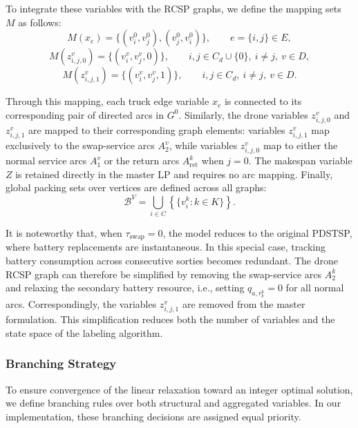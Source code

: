\documentclass[3p, authoryear, 11pt]{elsarticle}
\begin{document}
To integrate these variables with the RCSP graphs, we define the mapping sets $M$ as follows:
\[
M(x_e)=\{(v_i^0,v_j^0),(v_j^0,v_i^0)\},
\qquad e=\{i,j\}\in E,
\]
\[
M(z_{i,j,0}^v)=\{(v_i^v,v_j^v,0)\},
\qquad
i, j\in C_d\cup\{0\},\  i\neq j,\ v\in D,
\]
\[
M(z_{i,j,1}^v)=\{(v_i^v,v_j^v,1)\},
\qquad
i,j\in C_d,\ i\neq j,\ v\in D.
\]

Through this mapping, each truck edge variable $x_e$ is connected to its corresponding pair of directed arcs in $G^0$. Similarly, the drone variables $z_{i,j,0}^v$ and $z_{i,j,1}^v$ are mapped to their corresponding graph elements: variables $z_{i,j,1}^v$ map exclusively to the swap-service arcs $A_2^v$, while variables $z_{i,j,0}^v$ map to either the normal service arcs $A_1^v$ or the return arcs $A_{\mathrm{ret}}^k$ when $j = 0$. The makespan variable $Z$ is retained directly in the master LP and requires no arc mapping. Finally, global packing sets over vertices are defined across all graphs:
\[
\mathcal{B}^{V}
=
\bigcup_{i\in C}
\left\{
\{v_i^k:k\in K\}
\right\}.
\]

It is noteworthy that, when $\tau_{\mathrm{swap}}=0$, the model reduces to the original PDSTSP, where battery replacements are instantaneous. In this special case, tracking battery consumption across consecutive sorties becomes redundant. The drone RCSP graph can therefore be simplified by removing the swap-service arcs $A_2^k$ and relaxing the secondary battery resource, i.e., setting $q_{a,r_b^k}=0$ for all normal arcs. Correspondingly, the variables $z_{i,j,1}^v$ are removed from the master formulation. This simplification reduces both the number of variables and the state space of the labeling algorithm.

\subsubsection{Branching Strategy}
To ensure convergence of the linear relaxation toward an integer optimal solution, we define branching rules over both structural and aggregated variables. In our implementation, these branching decisions are assigned equal priority.
\end{document}
